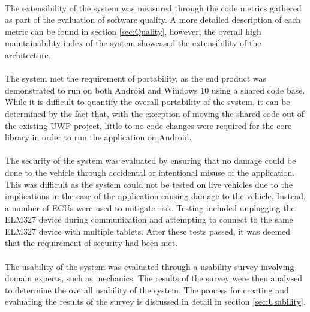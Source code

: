 	\paragraph{}{
	The extensibility of the system was measured through the code metrics gathered as part of the evaluation of software quality. A more detailed description of each metric can be found in section \ref{sec:Quality}, however, the overall high maintainability index of the system showcased the extensibility of the architecture.
	}
	\paragraph{}{
	The system met the requirement of portability, as the end product was demonstrated to run on both Android and Windows 10 using a shared code base. While it is difficult to quantify the overall portability of the system, it can be determined by the fact that, with the exception of moving the shared code out of the existing UWP project, little to no code changes were required for the core library in order to run the application on Android.
	}
	\paragraph{}{
	The security of the system was evaluated by ensuring that no damage could be done to the vehicle through accidental or intentional misuse of the application. This was difficult as the system could not be tested on live vehicles due to the implications in the case of the application causing damage to the vehicle. Instead, a number of ECUs were used to mitigate risk. Testing included unplugging the ELM327 device during communication and attempting to connect to the same ELM327 device with multiple tablets. After these tests passed, it was deemed that the requirement of security had been met.
	}
	\paragraph{}{
	The usability of the system was evaluated through a usability survey involving domain experts, such as mechanics. The results of the survey were then analysed to determine the overall usability of the system. The process for creating and evaluating the results of the survey is discussed in detail in section \ref{sec:Usability}.
	}
	
